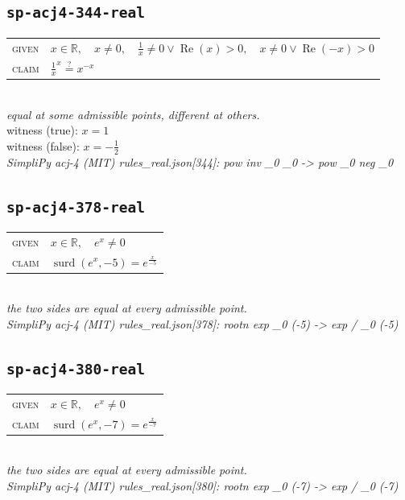 \documentclass[11pt]{article}
\begin{document}
\subsection*{\texttt{sp-acj4-344-real}}
\begin{tabular}{@{}l@{\quad}l@{}}
\textsc{given} & $x \in \mathbb{R},\quad x \neq 0,\quad \frac{1}{x} \neq 0 \lor \operatorname{Re}\left(x\right) > 0,\quad x \neq 0 \lor \operatorname{Re}\left(-x\right) > 0$ \\[4pt]
\textsc{claim} & $\displaystyle \frac{1}{x}^{x} \overset{?}{=} x^{-x}$ \\
\end{tabular}\\[2pt]
{\small\emph{equal at some admissible points, different at others.}}\\
{\footnotesize\color{gray}witness (true): $x = 1$}\\
{\footnotesize\color{gray}witness (false): $x = -\frac{1}{2}$}\\
\emph{SimpliPy acj-4 (MIT) rules\_real.json[344]: pow inv \_0 \_0  ->  pow \_0 neg \_0}\\

\subsection*{\texttt{sp-acj4-378-real}}
\begin{tabular}{@{}l@{\quad}l@{}}
\textsc{given} & $x \in \mathbb{R},\quad e^{x} \neq 0$ \\[4pt]
\textsc{claim} & $\displaystyle \operatorname{surd}\left(e^{x}, -5\right) = e^{\frac{x}{-5}}$ \\
\end{tabular}\\[2pt]
{\small\emph{the two sides are equal at every admissible point.}}\\
\emph{SimpliPy acj-4 (MIT) rules\_real.json[378]: rootn exp \_0 (-5)  ->  exp / \_0 (-5)}\\

\subsection*{\texttt{sp-acj4-380-real}}
\begin{tabular}{@{}l@{\quad}l@{}}
\textsc{given} & $x \in \mathbb{R},\quad e^{x} \neq 0$ \\[4pt]
\textsc{claim} & $\displaystyle \operatorname{surd}\left(e^{x}, -7\right) = e^{\frac{x}{-7}}$ \\
\end{tabular}\\[2pt]
{\small\emph{the two sides are equal at every admissible point.}}\\
\emph{SimpliPy acj-4 (MIT) rules\_real.json[380]: rootn exp \_0 (-7)  ->  exp / \_0 (-7)}\\
\end{document}
